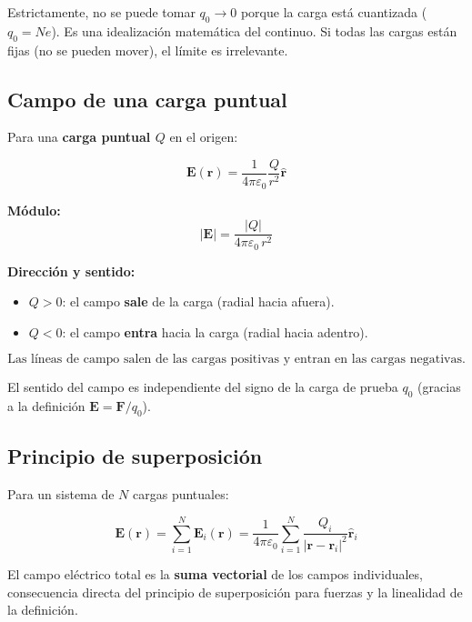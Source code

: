 \documentclass[12pt,a4paper]{article}
\begin{document}
\begin{warnbox}
  Estrictamente, no se puede tomar $q_0 \to 0$ porque la carga está
  cuantizada ($q_0 = Ne$). Es una idealización matemática del continuo.
  Si todas las cargas están fijas (no se pueden mover), el límite es
  irrelevante.
\end{warnbox}

\subsection{Campo de una carga puntual}

Para una \textbf{carga puntual $Q$} en el origen:

\[
\mathbf{E}(\mathbf{r}) =
\frac{1}{4\pi\varepsilon_0} \frac{Q}{r^{2}} \hat{\mathbf{r}}
\]

\textbf{Módulo:}
\[
|\mathbf{E}| = \frac{|Q|}{4\pi\varepsilon_0 \, r^{2}}
\]

\textbf{Dirección y sentido:}
\begin{itemize}[nosep]
  \item $Q > 0$: el campo \textbf{sale} de la carga (radial hacia
        afuera).
  \item $Q < 0$: el campo \textbf{entra} hacia la carga (radial hacia
        adentro).
\end{itemize}

\begin{keybox}
  \[
  \boxed{\text{Las líneas de campo salen de las cargas positivas
         y entran en las cargas negativas.}}
  \]
\end{keybox}

El sentido del campo es independiente del signo de la carga de prueba
$q_0$ (gracias a la definición $\mathbf{E} = \mathbf{F}/q_0$).

\subsection{Principio de superposición}

Para un sistema de $N$ cargas puntuales:

\[
\mathbf{E}(\mathbf{r}) = \sum_{i=1}^{N} \mathbf{E}_i(\mathbf{r})
= \frac{1}{4\pi\varepsilon_0}
  \sum_{i=1}^{N} \frac{Q_i}{|\mathbf{r} - \mathbf{r}_i|^{2}}
  \hat{\mathbf{r}}_i
\]

El campo eléctrico total es la \textbf{suma vectorial} de los campos
individuales, consecuencia directa del principio de superposición para
fuerzas y la linealidad de la definición.
\end{document}
